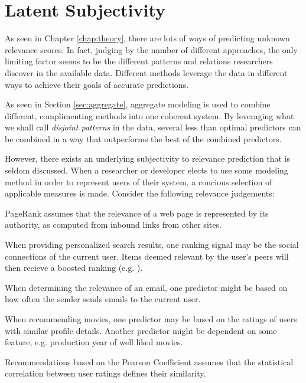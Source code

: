 \section{Latent Subjectivity}

As seen in Chapter \ref{chap:theory}, 
there are lots of ways of predicting unknown relevance scores. 
In fact, judging by the number of different approaches,
the only limiting factor seems to be the different 
patterns and relations researchers discover in the available data.
Different methods leverage the data in different ways
to achieve their goals of accurate predictions.

As seen in Section \ref{sec:aggregate},
aggregate modeling is used to combine different, complimenting
methods into one coherent system.
By leveraging what we shall call \emph{disjoint patterns}
in the data, several less than optimal predictors
can be combined in a way that outperforms the best
of the combined predictors.

However, there exists an underlying subjectivity to 
relevance prediction that is seldom discussed.
When a researcher or developer elects to use some modeling method
in order to represent users of their system,
a concious selection of applicable measures is made.
Consider the following relevance judgements:

\begin{itemize*}
  \item PageRank \citep{Bender2005} assumes that the relevance of a web page is 
  represented by its authority, as computed from inbound links from other sites.
  \item When providing personalized search results, one ranking signal may be 
  the social connections of the current user. Items deemed relevant by the user's 
  peers will then recieve a boosted ranking (e.g. \cite{Carmel2009}).
  \item When determining the relevance of an email, one predictor might be based
  on how often the sender sends emails to the current user.
  \item When recommending movies, one predictor may be based on the ratings
  of users with similar profile details. Another predictor might be 
  dependent on some feature, e.g. production year of well liked movies.
  \item Recommendations based on the Pearson Coefficient \cite[p11]{Segaran2007}
  assumes that the statistical correlation between user ratings defines their 
  similarity.
\end{itemize*}

